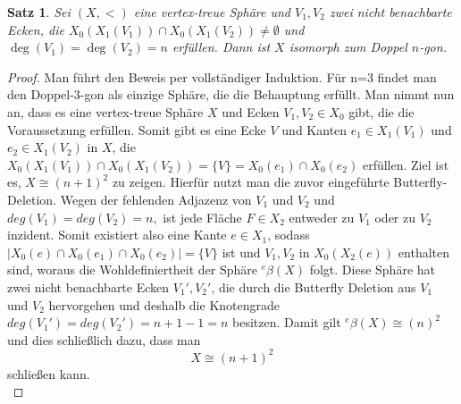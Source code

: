 \documentclass[12pt,titlepage,twoside,cleardoublepage]{article}
\theoremstyle{nummermitklammern}
\newtheorem{satz}[temp]{Satz}
\newtheorem{satz}[zahl]{Satz}
\numberwithin{equation}{section}
\begin{document}
\begin{satz}\label{ngon}
Sei $(X,<)$ eine vertex-treue Sphäre und $V_1,V_2$ zwei nicht benachbarte Ecken, die  $X_0(X_1(V_1))\cap X_0(X_1(V_2))\neq \emptyset$ und $\deg(V_1)=\deg(V_2)= n$ erfüllen. Dann ist $X$ isomorph zum Doppel $n$-gon.
\end{satz}
\begin{proof}
Man führt den Beweis per vollständiger Induktion. Für n=3 findet man den Doppel-3-gon als einzige Sphäre, die die Behauptung erfüllt. Man nimmt nun an, dass es eine vertex-treue Sphäre $X$ und Ecken $V_1,V_2\in X_0$ gibt, die die Voraussetzung erfüllen. Somit gibt es eine Ecke $V$ und Kanten $e_1\in X_1(V_1)$ und $e_2 \in X_1(V_2)$ in $X$, die $X_0(X_1(V_1))\cap X_0(X_1(V_2))=\{V\}=X_0(e_1)\cap X_0(e_2)$ erfüllen.
 Ziel ist es, $X\cong (n+1)^2$ zu zeigen. Hierfür nutzt man die zuvor eingeführte Butterfly-Deletion. Wegen der fehlenden Adjazenz von $V_1$ und $V_2$ und $deg(V_1)=deg(V_2)= n,$ ist jede Fläche $F\in X_2$ entweder zu $V_1$ oder zu $V_2$ inzident. Somit existiert also eine Kante $e\in X_1$, sodass $\vert X_0(e)\cap X_0(e_1)\cap X_0(e_2)\vert  =\{V\}$
 ist und $V_1,V_2$ in $X_0(X_2(e))$ enthalten sind, woraus die Wohldefiniertheit der Sphäre ${{}^e\beta(X)}$ folgt. Diese  Sphäre hat zwei nicht benachbarte Ecken $V_1',V_2'$, die durch die Butterfly Deletion aus $V_1$ und $V_2$ hervorgehen und deshalb die Knotengrade $deg(V_1')=deg(V_2')=n+1-1=n$ besitzen. Damit gilt ${{}^e\beta(X)}\cong (n)^2$ und dies schließlich dazu, dass man
 \[
X\cong (n+1)^2 
 \]
 schließen kann.\\
\end{proof}
\end{document}
